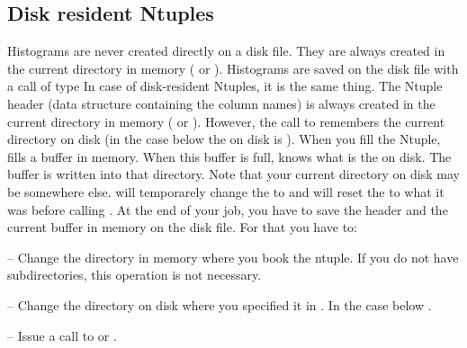 \begin{changebar}
\subsection*{Disk resident Ntuples}

Histograms are never created directly on a disk file. 
They are always created in the current directory in memory 
( or ).
Histograms are saved on the disk file with a call of type 
In case of disk-resident Ntuples, it is the same thing. 
The Ntuple header 
(data structure containing the column names) is always created
in the current directory in memory 
( or ).
However, the call to  remembers the current 
directory on disk (in the case below
the  on disk is ). 
When you fill the Ntuple,  fills a buffer in memory. 
When this buffer is full,  knows what is the  on disk.
The buffer is written into that directory. 
Note that your current directory on disk may be somewhere else. 
 will temporarely change the  to  
and will reset the  to what it was before calling .
At the end of your job, you have to save the header and the current buffer
in memory on the disk file. 
For that you have to:

\begin{UL}
\item[--] Change the directory in memory where you book the ntuple. 
          If you do not have subdirectories, 
          this operation is not necessary.
\item[--] Change the directory on disk where you specified it in 
          . 
          In the case below .
\item[--] Issue a call to  or .
\end{UL}


\end{changebar}
